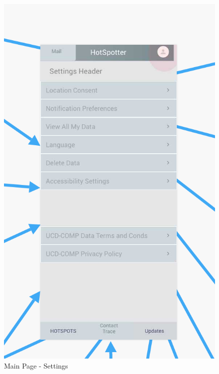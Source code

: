 \documentclass{scrreprt}
\begin{document}
\begin{figure}[H]
	\centering
	\includegraphics[page=1, width=0.9\linewidth]{COMP30830-Settings}
	\caption{Main Page - Settings}
	\label{Settings}
\end{figure}
\end{document}
